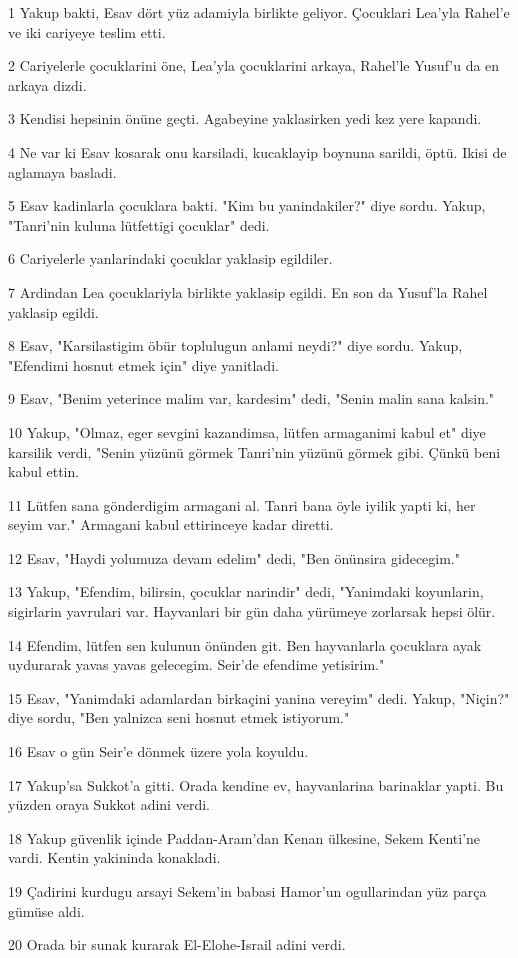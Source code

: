 \par 1 Yakup bakti, Esav dört yüz adamiyla birlikte geliyor. Çocuklari Lea'yla Rahel'e ve iki cariyeye teslim etti.
\par 2 Cariyelerle çocuklarini öne, Lea'yla çocuklarini arkaya, Rahel'le Yusuf'u da en arkaya dizdi.
\par 3 Kendisi hepsinin önüne geçti. Agabeyine yaklasirken yedi kez yere kapandi.
\par 4 Ne var ki Esav kosarak onu karsiladi, kucaklayip boynuna sarildi, öptü. Ikisi de aglamaya basladi.
\par 5 Esav kadinlarla çocuklara bakti. "Kim bu yanindakiler?" diye sordu. Yakup, "Tanri'nin kuluna lütfettigi çocuklar" dedi.
\par 6 Cariyelerle yanlarindaki çocuklar yaklasip egildiler.
\par 7 Ardindan Lea çocuklariyla birlikte yaklasip egildi. En son da Yusuf'la Rahel yaklasip egildi.
\par 8 Esav, "Karsilastigim öbür toplulugun anlami neydi?" diye sordu. Yakup, "Efendimi hosnut etmek için" diye yanitladi.
\par 9 Esav, "Benim yeterince malim var, kardesim" dedi, "Senin malin sana kalsin."
\par 10 Yakup, "Olmaz, eger sevgini kazandimsa, lütfen armaganimi kabul et" diye karsilik verdi, "Senin yüzünü görmek Tanri'nin yüzünü görmek gibi. Çünkü beni kabul ettin.
\par 11 Lütfen sana gönderdigim armagani al. Tanri bana öyle iyilik yapti ki, her seyim var." Armagani kabul ettirinceye kadar diretti.
\par 12 Esav, "Haydi yolumuza devam edelim" dedi, "Ben önünsira gidecegim."
\par 13 Yakup, "Efendim, bilirsin, çocuklar narindir" dedi, "Yanimdaki koyunlarin, sigirlarin yavrulari var. Hayvanlari bir gün daha yürümeye zorlarsak hepsi ölür.
\par 14 Efendim, lütfen sen kulunun önünden git. Ben hayvanlarla çocuklara ayak uydurarak yavas yavas gelecegim. Seir'de efendime yetisirim."
\par 15 Esav, "Yanimdaki adamlardan birkaçini yanina vereyim" dedi. Yakup, "Niçin?" diye sordu, "Ben yalnizca seni hosnut etmek istiyorum."
\par 16 Esav o gün Seir'e dönmek üzere yola koyuldu.
\par 17 Yakup'sa Sukkot'a gitti. Orada kendine ev, hayvanlarina barinaklar yapti. Bu yüzden oraya Sukkot adini verdi.
\par 18 Yakup güvenlik içinde Paddan-Aram'dan Kenan ülkesine, Sekem Kenti'ne vardi. Kentin yakininda konakladi.
\par 19 Çadirini kurdugu arsayi Sekem'in babasi Hamor'un ogullarindan yüz parça gümüse aldi.
\par 20 Orada bir sunak kurarak El-Elohe-Israil adini verdi.

